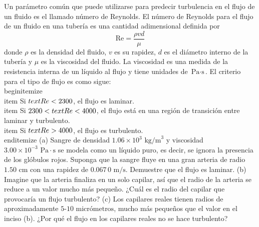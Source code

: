 \item Un parámetro común que puede utilizarse para predecir turbulencia en el flujo de un fluido es el llamado número de Reynolds. El número de Reynolds para el flujo de un fluido en una tubería es una cantidad adimensional definida por
$$ \text{Re} = \frac{\rho v d}{\mu} $$
donde $\rho$ es la densidad del fluido, $v$ es su rapidez, $d$ es el diámetro interno de la tubería y $\mu$ es la viscosidad del fluido. La viscosidad es una medida de la resistencia interna de un líquido al flujo y tiene unidades de $\text{Pa}\cdot\text{s}$. El criterio para el tipo de flujo es como sigue:
\\begin{itemize}
    \\item Si $\\text{Re} < 2300$, el flujo es laminar.
    \\item Si $2300 < \\text{Re} < 4000$, el flujo está en una región de transición entre laminar y turbulento.
    \\item Si $\\text{Re} > 4000$, el flujo es turbulento.
\\end{itemize}
(a) Sangre de densidad $1.06 \times 10^3 \text{ kg/m}^3$ y viscosidad $3.00 \times 10^{-3} \text{ Pa}\cdot\text{s}$ se modela como un líquido puro, es decir, se ignora la presencia de los glóbulos rojos. Suponga que la sangre fluye en una gran arteria de radio $1.50 \text{ cm}$ con una rapidez de $0.067\,0 \text{ m/s}$. Demuestre que el flujo es laminar. (b) Imagine que la arteria finaliza en un solo capilar, así que el radio de la arteria se reduce a un valor mucho más pequeño. ¿Cuál es el radio del capilar que provocaría un flujo turbulento? (c) Los capilares reales tienen radios de aproximadamente $5$-$10 \text{ micrómetros}$, mucho más pequeños que el valor en el inciso (b). ¿Por qué el flujo en los capilares reales no se hace turbulento?

